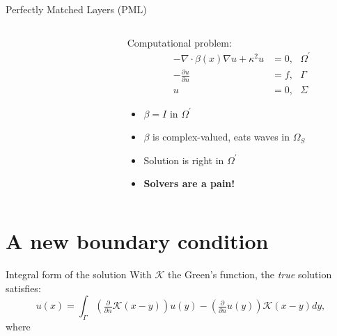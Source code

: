 \documentclass{beamer}
\begin{document}
\begin{frame}{Perfectly Matched Layers (PML)}
  \begin{columns}
    \begin{column}{0.5\textwidth}
  \begin{figure}[ht]
    \begin{center}
    \end{center}
  \end{figure}
    \end{column}
    \begin{column}{0.5\textwidth}
      Computational problem:
      \[
      \begin{split}
        -\nabla \cdot \beta(x) \nabla u + \kappa^2 u & = 0,  \ \ \ \Omega^\prime \\
        -\frac{\partial u}{\partial n} & =  f, \ \ \ \Gamma \\
        u & = 0, \ \ \ \Sigma
      \end{split}
      \]
      \begin{itemize}
      \item<2-> $\beta = I$ in $\Omega^\prime$
      \item<3-> $\beta$ is complex-valued, eats waves in $\Omega_S$
      \item<4-> Solution is right in $\Omega^\prime$
      \item<5-> {\bf Solvers are a pain!}
      \end{itemize}
    \end{column}
\end{columns}  
\end{frame}

\section{A new boundary condition}
\begin{frame}{Integral form of the solution}
With $\mathcal{K}$ the Green's function, the \emph{true} solution satisfies:
  \begin{equation*}
u(x) = \int_\Gamma \left( \tfrac{\partial}{\partial n} \mathcal K(x-y ) \right)u(y) - \left(\tfrac{\partial}{\partial n} u(y) \right) \mathcal K( x - y ) dy,
  \end{equation*}
  where
\end{frame}
\end{document}
